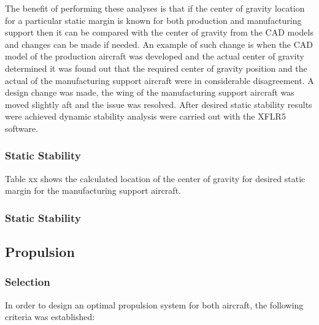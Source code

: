 The benefit of performing these analyses is that if the center of gravity location for a particular static margin is known for both production and manufacturing support then it can be compared with the center of gravity from the CAD models and changes can be made if needed. An example of such change is when the CAD model of the production aircraft was developed and the actual center of gravity determined it was found out that the required center of gravity position and the actual of the manufacturing support aircraft were in considerable disagreement. A design change was made, the wing of the manufacturing support aircraft was moved slightly aft and the issue was resolved. After desired static stability results were achieved dynamic stability analysis were carried out with the XFLR5 software.


\subsubsection{Static Stability}

Table xx shows the calculated location of the center of gravity for desired static margin for the manufacturing support aircraft. 


\subsubsection{Static Stability}


\subsection{Propulsion}

\subsubsection{Selection}

In order to design an optimal propulsion system for both aircraft, the following criteria was established:

